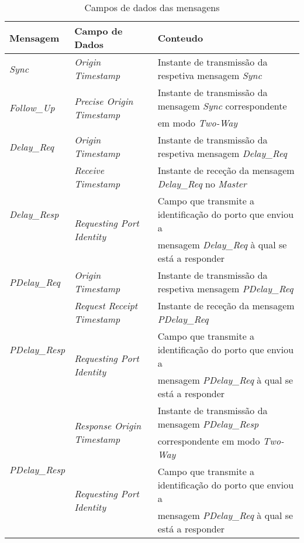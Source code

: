 \begin{table}
\begin{center}
\begin{tabular}{|l| l|l|}

    \hline
    Mensagem & Campo de Dados & Conteudo \\
    \hline
     \textit{Sync} & \textit{Origin Timestamp} & Instante de transmissão da respetiva mensagem \textit{Sync} \\
    \hline
    \multirow{2}{*}{\textit{Follow\_Up}} & \multirow{2}{*}{\textit{Precise Origin Timestamp}} & Instante de transmissão da mensagem \textit{Sync} correspondente  \\
    & & em modo \textit{Two-Way} \\
    \hline
    \textit{Delay\_Req} & \textit{Origin Timestamp} & Instante de transmissão da respetiva mensagem \textit{Delay\_Req} \\
    \hline
    \multirow{3}{*}{\textit{Delay\_Resp}} & \textit{Receive Timestamp} & Instante de receção
    da mensagem \textit{Delay\_Req} no \textit{Master}\\
    \cline{2-3}
    & \multirow{2}{*}{\textit{Requesting Port Identity}}  &  Campo que transmite a identificação do porto que enviou a \\
    &   &  mensagem \textit{Delay\_Req} à qual se está a responder\\
    \hline
    \textit{PDelay\_Req} & \textit{Origin Timestamp} & Instante de transmissão da respetiva mensagem \textit{PDelay\_Req} \\
    \hline
     \multirow{3}{*}{\textit{PDelay\_Resp}} & \textit{Request Receipt Timestamp} & Instante de receção
    da mensagem \textit{PDelay\_Req} \\
    \cline{2-3}
    & \multirow{2}{*}{\textit{Requesting Port Identity}}  &  Campo que transmite a identificação do porto que enviou a \\
    &   &  mensagem \textit{PDelay\_Req} à qual se está a responder\\
    \hline
    \multirow{4}{*}{\textit{PDelay\_Resp}} & \multirow{2}{*}{\textit{Response Origin Timestamp}} & Instante de transmissão da mensagem \textit{PDelay\_Resp}  \\
    & & correspondente em modo \textit{Two-Way} \\
    \cline{2-3}
    & \multirow{2}{*}{\textit{Requesting Port Identity}}  &  Campo que transmite a identificação do porto que enviou a \\
    &   &  mensagem \textit{PDelay\_Req} à qual se está a responder\\
    \hline
    
    \hline
\end{tabular}
\end{center}
\caption{Campos de dados das mensagens}\label{Campos de dados das mensagens}
\end{table}

